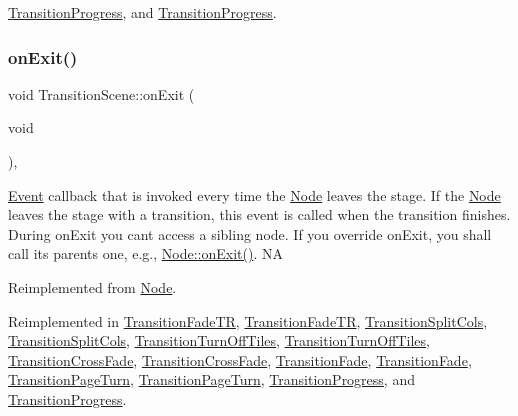 \hyperlink{classTransitionProgress_aa3ccb7515691f10b5410b75d912e2b68}{Transition\+Progress}, and \hyperlink{classTransitionProgress_a4bb6172fb74abe0a0a0de2a3742a9cf6}{Transition\+Progress}.

\mbox{\label{classTransitionScene_a45e39b658189c79428a05c3bc3173bbb}} 
\subsubsection{\texorpdfstring{on\+Exit()}{onExit()}\hspace{0.1cm}{\footnotesize\ttfamily [1/2]}}
{\footnotesize\ttfamily void Transition\+Scene\+::on\+Exit (\begin{DoxyParamCaption}\item[{void}]{ }\end{DoxyParamCaption})\hspace{0.3cm}{\ttfamily [override]}, {\ttfamily [virtual]}}

\hyperlink{classEvent}{Event} callback that is invoked every time the \hyperlink{classNode}{Node} leaves the \textquotesingle{}stage\textquotesingle{}. If the \hyperlink{classNode}{Node} leaves the \textquotesingle{}stage\textquotesingle{} with a transition, this event is called when the transition finishes. During on\+Exit you can\textquotesingle{}t access a sibling node. If you override on\+Exit, you shall call its parent\textquotesingle{}s one, e.\+g., \hyperlink{classNode_ac83de835ea315e3179d4293acd8903ac}{Node\+::on\+Exit()}.  NA 

Reimplemented from \hyperlink{classNode_ac83de835ea315e3179d4293acd8903ac}{Node}.



Reimplemented in \hyperlink{classTransitionFadeTR_a9460b2272ddd276f68727429474b6862}{Transition\+Fade\+TR}, \hyperlink{classTransitionFadeTR_a62a984bd87eb2090da0e542e5ce91cce}{Transition\+Fade\+TR}, \hyperlink{classTransitionSplitCols_aaf1b4e4345002bda3404ae89e10d5fe1}{Transition\+Split\+Cols}, \hyperlink{classTransitionSplitCols_af083146c10d56bb5342ae286c2967e67}{Transition\+Split\+Cols}, \hyperlink{classTransitionTurnOffTiles_a690a28870ab7e338aa4645134869f520}{Transition\+Turn\+Off\+Tiles}, \hyperlink{classTransitionTurnOffTiles_ad178c23408dd18b341e043ae5d645499}{Transition\+Turn\+Off\+Tiles}, \hyperlink{classTransitionCrossFade_a18832603241957b4c6700b84b7b587e0}{Transition\+Cross\+Fade}, \hyperlink{classTransitionCrossFade_a87aa5397c6cdba91bd477a9df1534730}{Transition\+Cross\+Fade}, \hyperlink{classTransitionFade_a84179a9a978c9ff2e302e913f7d90cc4}{Transition\+Fade}, \hyperlink{classTransitionFade_aa476da6459ad94c3fb3254a261fe3161}{Transition\+Fade}, \hyperlink{classTransitionPageTurn_adf4182d3e59e362c1ca5beec367d7bf9}{Transition\+Page\+Turn}, \hyperlink{classTransitionPageTurn_a5c53ecc8cf81db631e7af1c5fa12d942}{Transition\+Page\+Turn}, \hyperlink{classTransitionProgress_a8682fe8c7c42a31c6796bff2e4e1fef5}{Transition\+Progress}, and \hyperlink{classTransitionProgress_a19b22f6e9a1d4e48d1d4b61e17fec363}{Transition\+Progress}.

